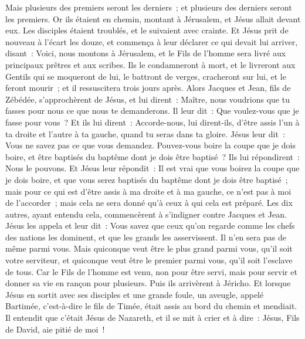 \begin{multicols}{2}
Mais plusieurs des premiers seront les derniers~; et plusieurs des derniers seront les premiers.
Or ils étaient en chemin, montant à Jérusalem, et Jésus allait devant eux. Les disciples étaient troublés, et le suivaient avec crainte. Et Jésus prit de nouveau à l'écart les douze, et commença à leur déclarer ce qui devait lui arriver,
disant~: Voici, nous montons à Jérusalem, et le Fils de l'homme sera livré aux principaux prêtres et aux scribes. Ils le condamneront à mort, et le livreront aux Gentils
qui se moqueront de lui, le battront de verges, cracheront sur lui, et le feront mourir~; et il ressuscitera trois jours après.
Alors Jacques et Jean, fils de Zébédée, s'approchèrent de Jésus, et lui dirent~: Maître, nous voudrions que tu fasses pour nous ce que nous te demanderons.
Il leur dit~: Que voulez-vous que je fasse pour vous~?
Et ils lui dirent~: Accorde-nous, lui dirent-ils, d'être assis l'un à ta droite et l'autre à ta gauche, quand tu seras dans ta gloire.
Jésus leur dit~: Vous ne savez pas ce que vous demandez. Pouvez-vous boire la coupe que je dois boire, et être baptisés du baptême dont je dois être baptisé~?
Ils lui répondirent~: Nous le pouvons. Et Jésus leur répondit~: Il est vrai que vous boirez la coupe que je dois boire, et que vous serez baptisés du baptême dont je dois être baptisé~;
mais pour ce qui est d'être assis à ma droite et à ma gauche, ce n'est pas à moi de l'accorder~; mais cela ne sera donné qu'à ceux à qui cela est préparé.
Les dix autres, ayant entendu cela, commencèrent à s'indigner contre Jacques et Jean.
Jésus les appela et leur dit~: Vous savez que ceux qu'on regarde comme les chefs des nations les dominent, et que les grands les asservissent.
Il n'en sera pas de même parmi vous. Mais quiconque veut être le plus grand parmi vous, qu'il soit votre serviteur,
et quiconque veut être le premier parmi vous, qu'il soit l'esclave de tous.
Car le Fils de l'homme est venu, non pour être servi, mais pour servir et donner sa vie en rançon pour plusieurs.
Puis ils arrivèrent à Jéricho. Et lorsque Jésus en sortit avec ses disciples et une grande foule, un aveugle, appelé Bartimée, c'est-à-dire le fils de Timée, était assis au bord du chemin et mendiait.
Il entendit que c'était Jésus de Nazareth, et il se mit à crier et à dire~: Jésus, Fils de David, aie pitié de moi~!

\end{multicols}
